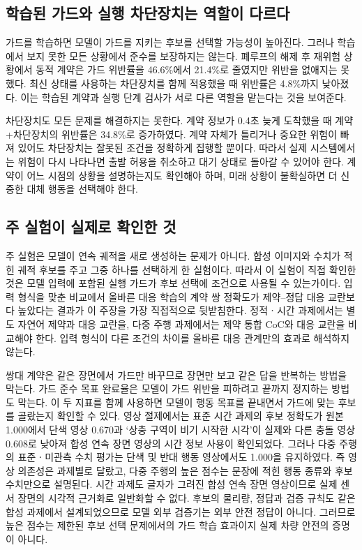 \subsection{학습된 가드와 실행 차단장치는 역할이 다르다}

가드를 학습하면 모델이 가드를 지키는 후보를 선택할 가능성이 높아진다. 그러나 학습에서 보지 못한 모든 상황에서 준수를 보장하지는 않는다. 폐루프의 해제 후 재위험 상황에서 동적 계약은 가드 위반률을 46.6\%에서 21.4\%로 줄였지만 위반을 없애지는 못했다. 최신 상태를 사용하는 차단장치를 함께 적용했을 때 위반률은 4.8\%까지 낮아졌다. 이는 학습된 계약과 실행 단계 검사가 서로 다른 역할을 맡는다는 것을 보여준다.

차단장치도 모든 문제를 해결하지는 못한다. 계약 정보가 0.4초 늦게 도착했을 때 계약+차단장치의 위반률은 34.8\%로 증가하였다. 계약 자체가 틀리거나 중요한 위험이 빠져 있어도 차단장치는 잘못된 조건을 정확하게 집행할 뿐이다. 따라서 실제 시스템에서는 위험이 다시 나타나면 출발 허용을 취소하고 대기 상태로 돌아갈 수 있어야 한다. 계약이 어느 시점의 상황을 설명하는지도 확인해야 하며, 미래 상황이 불확실하면 더 신중한 대체 행동을 선택해야 한다.

\subsection{주 실험이 실제로 확인한 것}

주 실험은 모델이 연속 궤적을 새로 생성하는 문제가 아니다. 합성 이미지와 수치가 적힌 궤적 후보를 주고 그중 하나를 선택하게 한 실험이다. 따라서 이 실험이 직접 확인한 것은 모델 입력에 포함된 실행 가드가 후보 선택에 조건으로 사용될 수 있는가이다. 입력 형식을 맞춘 비교에서 올바른 대응 학습의 계약 쌍 정확도가 제약--정답 대응 교란보다 높았다는 결과가 이 주장을 가장 직접적으로 뒷받침한다. 정적ㆍ시간 과제에서는 별도 자연어 제약과 대응 교란을, 다중 주행 과제에서는 제약 통합 CoC와 대응 교란을 비교해야 한다. 입력 형식이 다른 조건의 차이를 올바른 대응 관계만의 효과로 해석하지 않는다.

쌍대 계약은 같은 장면에서 가드만 바꾸므로 장면만 보고 같은 답을 반복하는 방법을 막는다. 가드 준수 목표 완료율은 모델이 가드 위반을 피하려고 끝까지 정지하는 방법도 막는다. 이 두 지표를 함께 사용하면 모델이 행동 목표를 끝내면서 가드에 맞는 후보를 골랐는지 확인할 수 있다. 영상 절제에서는 표준 시간 과제의 후보 정확도가 원본 1.000에서 단색 영상 0.670과 `상충 구역이 비기 시작한 시각'이 실제와 다른 충돌 영상 0.608로 낮아져 합성 연속 장면 영상의 시간 정보 사용이 확인되었다. 그러나 다중 주행의 표준ㆍ미관측 수치 평가는 단색 및 반대 행동 영상에서도 1.000을 유지하였다. 즉 영상 의존성은 과제별로 달랐고, 다중 주행의 높은 점수는 문장에 적힌 행동 종류와 후보 수치만으로 설명된다. 시간 과제도 글자가 그려진 합성 연속 장면 영상이므로 실제 센서 장면의 시각적 근거화로 일반화할 수 없다. 후보의 물리량, 정답과 검증 규칙도 같은 합성 과제에서 설계되었으므로 모델 외부 검증기는 외부 안전 정답이 아니다. 그러므로 높은 점수는 제한된 후보 선택 문제에서의 가드 학습 효과이지 실제 차량 안전의 증명이 아니다.

